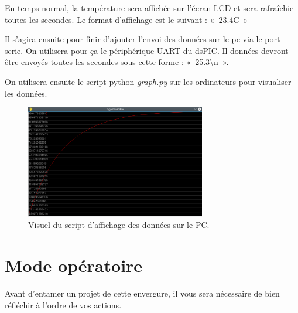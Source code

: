 \documentclass[11pt,a4paper]{article}
\theoremstyle{definition}%
\begin{document}
En temps normal, la température sera affichée sur l’écran LCD et sera rafraîchie toutes les secondes.
Le format d’affichage est le suivant : «~23.4C~»

Il s'agira ensuite pour finir d'ajouter l'envoi des données sur le pc via le port
serie. On utilisera pour ça le périphérique UART du dsPIC.
Il données devront être envoyés toutes les secondes sous cette forme : «~25.3\textbackslash n~».

On utilisera ensuite le script python \textit{graph.py} sur les ordinateurs pour visualiser
les données.

\begin{figure}[H]
\center
\includegraphics[width=0.7\textwidth]{graph}
\caption{Visuel du script d'affichage des données sur le PC.}
\label{fig:graphpy}
\end{figure}







\section{Mode opératoire}
Avant d’entamer un projet de cette envergure, il vous sera nécessaire de bien réfléchir à l’ordre de vos actions.
\end{document}
